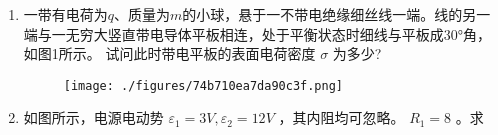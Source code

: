 
\begin{enumerate}
\item 一带有电荷为$q$、质量为$m$的小球，悬于一不带电绝缘细丝线一端。线的另一端与一无穷大竖直带电导体平板相连，处于平衡状态时细线与平板成$30$°角，如图1所示。 试问此时带电平板的表面电荷密度 $\sigma$ 为多少?
\begin{figure}[ht]
\centering
\texttt{[image: ./figures/74b710ea7da90c3f.png]}
\caption{} \label{fig_ZKYP06_1}
\end{figure}
\item 如图所示，电源电动势  $\varepsilon_1=3V,\varepsilon_2=12V$ ，其内阻均可忽略。 $R_1=8$  。求
\end{enumerate}